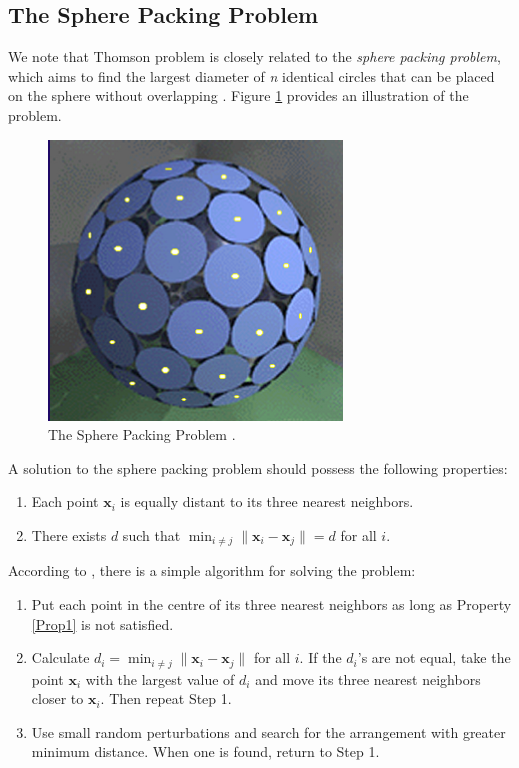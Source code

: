\documentclass[11pt]{article}
\begin{document}
\subsection{The Sphere Packing Problem}

We note that Thomson problem is closely related to the \emph{sphere packing problem}, which aims to find the largest diameter of \textit{n} identical circles that can be placed on the sphere without overlapping \cite{SpherePack}. Figure \ref{fig:SpherePack} provides an illustration of the problem.

\begin{figure}[!htb]
\centering
\includegraphics[width=0.5\columnwidth]{packing_problem.png}
\caption{The Sphere Packing Problem \cite{SpherePack}.}
\label{fig:SpherePack}
\end{figure}

A solution to the sphere packing problem should possess the following properties:
\begin{enumerate}[label=\arabic{*})]
	\item Each point $\bm{x}_i$ is equally distant to its three nearest neighbors.\label{Prop1}
	\item There exists $d$ such that $\min_{i \neq j} \| \bm{x}_i - \bm{x}_j \|= d$ for all $i$.
\end{enumerate}
According to \cite{SpherePack}, there is a simple algorithm for solving the problem:
\begin{enumerate}[label=\emph{Step \arabic{*}:}]
	\item Put each point in the centre of its three nearest neighbors as long as Property \ref{Prop1} is not satisfied.
	\item Calculate $d_i = \min_{i \neq j} \|\bm{x}_i - \bm{x}_j\|$ for all $i$. If the  $d_i$'s are not equal, take the point $\bm{x}_i$ with the largest value of $d_i$ and move its three nearest neighbors closer to $\bm{x}_i$. Then repeat Step 1.
	\item Use small random perturbations and search for the arrangement with greater minimum distance. When one is found, return to Step 1.
\end{enumerate}

\nocite{*}


\end{document}
